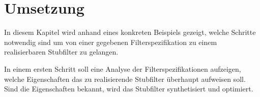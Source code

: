 \section{Umsetzung}

In  diesem  Kapitel  wird  anhand  eines  konkreten  Beispiels gezeigt, welche
Schritte notwendig sind um von  einer  gegebenen  Filterspezifikation zu einem
realisierbaren Stubfilter zu gelangen.

In einem ersten Schritt soll eine Analyse der Filterspezifikationen aufzeigen,
welche Eigenschaften das zu realisierende Stubfilter überhaupt aufweisen soll.
Sind  die  Eigenschaften  bekannt,  wird  das  Stubfilter   synthetisiert  und
optimiert.






